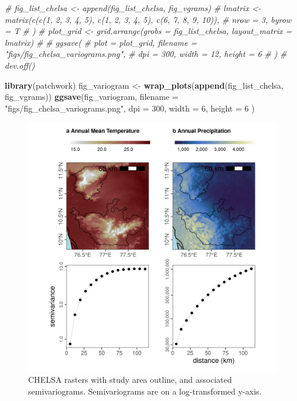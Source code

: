 \documentclass[]{article}
\newenvironment{Shaded}{\begin{snugshade}}{\end{snugshade}}
\newcommand{\CommentTok}[1]{\textcolor[rgb]{0.56,0.35,0.01}{\textit{#1}}}
\newcommand{\DataTypeTok}[1]{\textcolor[rgb]{0.13,0.29,0.53}{#1}}
\newcommand{\DecValTok}[1]{\textcolor[rgb]{0.00,0.00,0.81}{#1}}
\newcommand{\KeywordTok}[1]{\textcolor[rgb]{0.13,0.29,0.53}{\textbf{#1}}}
\newcommand{\NormalTok}[1]{#1}
\newcommand{\StringTok}[1]{\textcolor[rgb]{0.31,0.60,0.02}{#1}}
\begin{document}
\begin{Shaded}
\begin{Highlighting}[numbers=left,,]
\CommentTok{# fig_list_chelsa <- append(fig_list_chelsa, fig_vgrams)}
\CommentTok{# lmatrix <- matrix(c(c(1, 2, 3, 4, 5), c(1, 2, 3, 4, 5), c(6, 7, 8, 9, 10)),}
\CommentTok{#   nrow = 3, byrow = T}
\CommentTok{# )}
\CommentTok{# plot_grid <- grid.arrange(grobs = fig_list_chelsa, layout_matrix = lmatrix)}
\CommentTok{#}
\CommentTok{# ggsave(}
\CommentTok{#   plot = plot_grid, filename = "figs/fig_chelsa_variograms.png",}
\CommentTok{#   dpi = 300, width = 12, height = 6}
\CommentTok{# )}
\CommentTok{# dev.off()}

\KeywordTok{library}\NormalTok{(patchwork)}
\NormalTok{fig_variogram <-}\StringTok{ }\KeywordTok{wrap_plots}\NormalTok{(}\KeywordTok{append}\NormalTok{(fig_list_chelsa, fig_vgrams))}
\KeywordTok{ggsave}\NormalTok{(fig_variogram,}
  \DataTypeTok{filename =} \StringTok{"figs/fig_chelsa_variograms.png"}\NormalTok{,}
  \DataTypeTok{dpi =} \DecValTok{300}\NormalTok{,}
  \DataTypeTok{width =} \DecValTok{6}\NormalTok{, }\DataTypeTok{height =} \DecValTok{6}
\NormalTok{)}
\end{Highlighting}
\end{Shaded}

\begin{figure}
\centering
\includegraphics{figs/fig_chelsa_variograms.png}
\caption{CHELSA rasters with study area outline, and associated semivariograms. Semivariograms are on a log-transformed y-axis.}
\end{figure}
\end{document}
